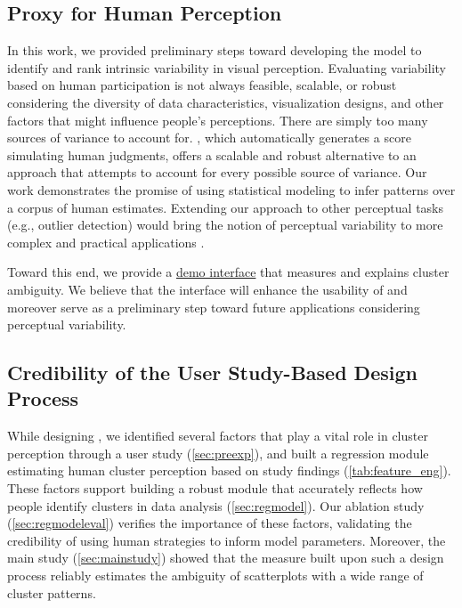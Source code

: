 \subsection{Proxy for Human Perception}
In this work, we provided preliminary steps toward developing the model to identify and rank intrinsic variability in visual perception. 
Evaluating variability based on human participation is not always feasible, scalable, or robust considering 
the diversity of data characteristics, visualization designs, and other factors that might influence people's perceptions. There are simply too many sources of variance to account for.
% 
\measure, which automatically generates a score simulating human judgments, offers a scalable and robust alternative to an approach that attempts to account for every possible source of variance. 
% 
Our work demonstrates the promise of using statistical modeling to infer patterns over a corpus of human estimates.  
% 
Extending our 
approach to other perceptual tasks (e.g., outlier detection)
would 
bring the notion of perceptual variability to more complex and practical applications \cite{moritz2018formalizing}.


Toward this end, we provide a \href{http://www.clusterambiguity.dev.s3-website.ap-northeast-2.amazonaws.com/}{demo interface} that measures and explains cluster ambiguity. 
We believe that the interface will enhance the usability of \measure and moreover serve as a preliminary step toward future applications considering perceptual variability.

\subsection{Credibility of the User Study-Based Design Process}

\label{sec:credibility}

While designing \measure, we identified several factors that play a vital role in cluster perception through a user study (\autoref{sec:preexp}), and built a regression module estimating human cluster perception based on study findings (\autoref{tab:feature_eng}). These factors support building a robust module that accurately reflects how people identify clusters in data analysis (\autoref{sec:regmodel}).
Our ablation study (\autoref{sec:regmodeleval}) verifies the importance of these factors, validating the credibility of using human strategies to inform model parameters. 
Moreover, the main study (\autoref{sec:mainstudy}) showed that the measure built upon such a design process reliably estimates the ambiguity of scatterplots with a wide range of cluster patterns.


